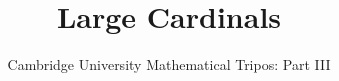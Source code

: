 \documentclass{article}
\title{Large Cardinals}
\author{Cambridge University Mathematical Tripos: Part III}
\begin{document}
\maketitle

\tableofcontentsnewpage{}

% 
\end{document}
